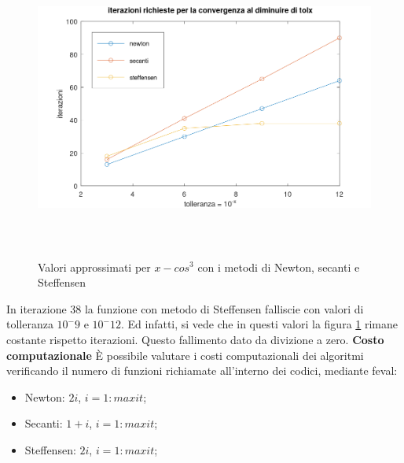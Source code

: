 \begin{figure}[!ht]
        \centering
        \includegraphics[width=16cm,height=10cm,keepaspectratio]{capitolo2/es7_figure.png}
        \caption{Valori approssimati per $x - cos^{3}$ con i metodi di Newton, secanti e Steffensen}
        \label{fig:es7}
\end{figure}
\FloatBarrier
In iterazione $38$ la funzione con metodo di Steffensen falliscie con valori di tolleranza
$10^-9$ e $10^-12$. Ed infatti, si vede che in questi valori la figura \ref{fig:es7}
rimane costante rispetto iterazioni. Questo fallimento dato da divizione a zero.
\newline \textbf{Costo computazionale} \newline
È possibile valutare i costi computazionali dei algoritmi verificando il numero
di funzioni richiamate all'interno dei codici, mediante feval:
\begin{itemize}
        \item Newton: $2i$, $i=1:maxit$;
        \item Secanti: $1 + i$, $i=1:maxit$;
        \item Steffensen: $2i$, $i=1:maxit$;
\end{itemize}
